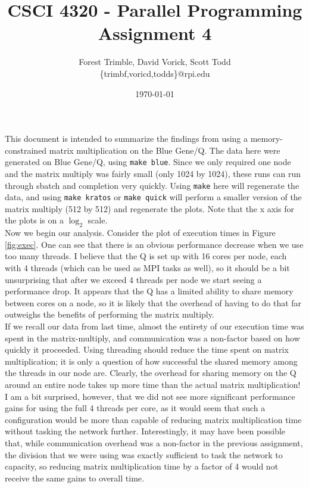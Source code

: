 \documentclass[twocolumn]{article}
\title{CSCI 4320 - Parallel Programming\\Assignment 4}
\author{Forest Trimble, David Vorick, Scott Todd\\\{trimbf,voricd,todds\}@rpi.edu}
\date{\today}
\begin{document}
\maketitle

\pagestyle{fancy}
\fancyhead{}
\fancyhead[R]{\today}

This document is intended to summarize the findings from using a 
memory-constrained matrix multiplication on the Blue Gene/Q. The data here were 
generated on Blue Gene/Q, using \texttt{make blue}. Since we only required one 
node and the matrix multiply was fairly small (only 1024 by 1024), these runs
can run through sbatch and completion very quickly. Using \texttt{make} here will
regenerate the data, and using \texttt{make kratos} or \texttt{make quick} 
will perform a smaller version of the matrix multiply (512 by 512) and regenerate
the plots. Note that the x axis for the plots is on a $\log_2$ scale.\\

Now we begin our analysis. Consider the plot of execution times in Figure 
\ref{fig:exec}. One can see that there is an obvious performance decrease when we
use too many threads. I believe that the Q is set up with 16 cores per node, each 
with 4 threads (which can be used as MPI tasks as well), so it should be a bit 
unsurprising that after we exceed 4 threads per node we start seeing a performance
drop. It appears that the Q has a limited ability to share memory between cores on 
a node, so it is likely that the overhead of having to do that far outweighs the
benefits of performing the matrix multiply. \\

If we recall our data from last time, almost the entirety of our 
execution time was spent in the matrix-multiply, and communication was a 
non-factor based on how quickly it proceeded. Using threading should reduce the 
time spent on matrix multiplication; it is only a question of how successful the
shared memory among the threads in our node are. Clearly, the overhead for sharing
memory on the Q around an entire node takes up more time than the actual matrix 
multiplication! I am a bit surprised, however, that we did not see more significant
performance gains for using the full 4 threads per core, as it would seem that such
a configuration would be more than capable of reducing matrix multiplication time
without tasking the network further. Interestingly, it may have been possible that, 
while communication overhead was a non-factor in the previous assignment, the 
division that we were using was exactly sufficient to task the network to capacity,
so reducing matrix multiplication time by a factor of 4 would not receive the same 
gains to overall time. \\
\end{document}
